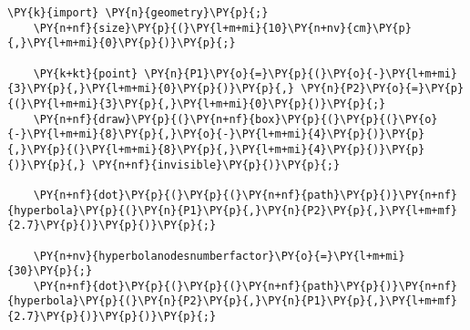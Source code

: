 \begin{Verbatim}[commandchars=\\\{\}]
    \PY{k}{import} \PY{n}{geometry}\PY{p}{;}
    \PY{n+nf}{size}\PY{p}{(}\PY{l+m+mi}{10}\PY{n+nv}{cm}\PY{p}{,}\PY{l+m+mi}{0}\PY{p}{)}\PY{p}{;}

    \PY{k+kt}{point} \PY{n}{P1}\PY{o}{=}\PY{p}{(}\PY{o}{-}\PY{l+m+mi}{3}\PY{p}{,}\PY{l+m+mi}{0}\PY{p}{)}\PY{p}{,} \PY{n}{P2}\PY{o}{=}\PY{p}{(}\PY{l+m+mi}{3}\PY{p}{,}\PY{l+m+mi}{0}\PY{p}{)}\PY{p}{;}
    \PY{n+nf}{draw}\PY{p}{(}\PY{n+nf}{box}\PY{p}{(}\PY{p}{(}\PY{o}{-}\PY{l+m+mi}{8}\PY{p}{,}\PY{o}{-}\PY{l+m+mi}{4}\PY{p}{)}\PY{p}{,}\PY{p}{(}\PY{l+m+mi}{8}\PY{p}{,}\PY{l+m+mi}{4}\PY{p}{)}\PY{p}{)}\PY{p}{,} \PY{n+nf}{invisible}\PY{p}{)}\PY{p}{;}

    \PY{n+nf}{dot}\PY{p}{(}\PY{p}{(}\PY{n+nf}{path}\PY{p}{)}\PY{n+nf}{hyperbola}\PY{p}{(}\PY{n}{P1}\PY{p}{,}\PY{n}{P2}\PY{p}{,}\PY{l+m+mf}{2.7}\PY{p}{)}\PY{p}{)}\PY{p}{;}

    \PY{n+nv}{hyperbolanodesnumberfactor}\PY{o}{=}\PY{l+m+mi}{30}\PY{p}{;}
    \PY{n+nf}{dot}\PY{p}{(}\PY{p}{(}\PY{n+nf}{path}\PY{p}{)}\PY{n+nf}{hyperbola}\PY{p}{(}\PY{n}{P2}\PY{p}{,}\PY{n}{P1}\PY{p}{,}\PY{l+m+mf}{2.7}\PY{p}{)}\PY{p}{)}\PY{p}{;}
\end{Verbatim}
